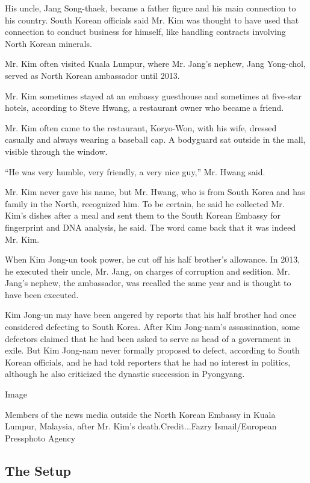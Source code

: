 His uncle, Jang Song-thaek, became a father figure and his main
connection to his country. South Korean officials said Mr. Kim was
thought to have used that connection to conduct business for himself,
like handling contracts involving North Korean minerals.

Mr. Kim often visited Kuala Lumpur, where Mr. Jang's nephew, Jang
Yong-chol, served as North Korean ambassador until 2013.

Mr. Kim sometimes stayed at an embassy guesthouse and sometimes at
five-star hotels, according to Steve Hwang, a restaurant owner who
became a friend.

Mr. Kim often came to the restaurant, Koryo-Won, with his wife, dressed
casually and always wearing a baseball cap. A bodyguard sat outside in
the mall, visible through the window.

``He was very humble, very friendly, a very nice guy,'' Mr. Hwang said.

Mr. Kim never gave his name, but Mr. Hwang, who is from South Korea and
has family in the North, recognized him. To be certain, he said he
collected Mr. Kim's dishes after a meal and sent them to the South
Korean Embassy for fingerprint and DNA analysis, he said. The word came
back that it was indeed Mr. Kim.

When Kim Jong-un took power, he cut off his half brother's allowance. In
2013, he executed their uncle, Mr. Jang, on charges of corruption and
sedition. Mr. Jang's nephew, the ambassador, was recalled the same year
and is thought to have been executed.

Kim Jong-un may have been angered by reports that his half brother had
once considered defecting to South Korea. After Kim Jong-nam's
assassination, some defectors claimed that he had been asked to serve as
head of a government in exile. But Kim Jong-nam never formally proposed
to defect, according to South Korean officials, and he had told
reporters that he had no interest in politics, although he also
criticized the dynastic succession in Pyongyang.

Image

Members of the news media outside the North Korean Embassy in Kuala
Lumpur, Malaysia, after Mr. Kim's death.Credit...Fazry Ismail/European
Pressphoto Agency

\hypertarget{the-setup}{%
\subsection{The Setup}\label{the-setup}}

